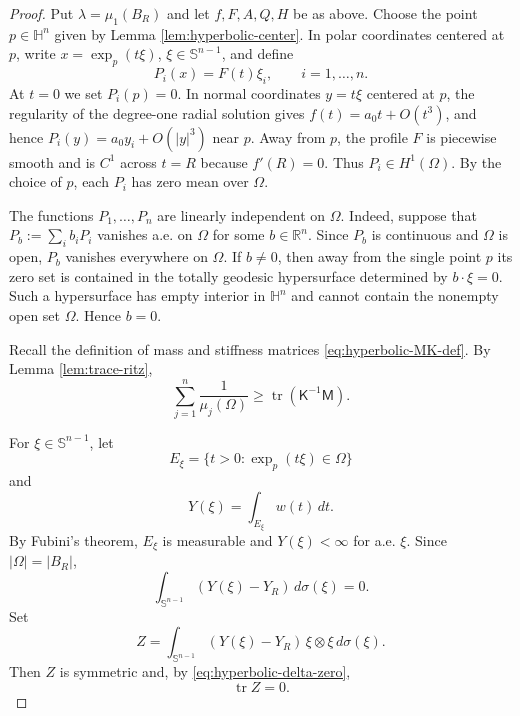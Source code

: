 \documentclass[11pt]{amsart}
\theoremstyle{remark}
\DeclareMathOperator{\tr}{tr}
\newcommand{\HH}{\mathbb H}
\newcommand{\RR}{\mathbb R}
\newcommand{\Sn}{\mathbb S}
\newcommand{\mcM}{\mathsf M}
\newcommand{\mcK}{\mathsf K}
\begin{document}
\begin{proof}
Put $\lambda=\mu_1(B_R)$ and let $f,F,A,Q,H$ be as above.  Choose the point $p\in\HH^n$ given by Lemma \ref{lem:hyperbolic-center}.  In polar coordinates centered at $p$, write $x=\exp_p(t\xi)$, $\xi\in\Sn^{n-1}$, and define
\begin{equation}\label{eq:hyperbolic-P-def}
        P_i(x)=F(t)\xi_i,
        \qquad i=1,\dots,n.
\end{equation}
At $t=0$ we set $P_i(p)=0$.  In normal coordinates $y=t\xi$ centered at $p$, the regularity of the degree-one radial solution gives $f(t)=a_0t+O(t^3)$, and hence $P_i(y)=a_0y_i+O(|y|^3)$ near $p$.  Away from $p$, the profile $F$ is piecewise smooth and is $C^1$ across $t=R$ because $f'(R)=0$.  Thus $P_i\in H^1(\Omega)$.  By the choice of $p$, each $P_i$ has zero mean over $\Omega$.

The functions $P_1,\dots,P_n$ are linearly independent on $\Omega$.  Indeed, suppose that $P_b:=\sum_i b_iP_i$ vanishes a.e. on $\Omega$ for some $b\in\RR^n$.  Since $P_b$ is continuous and $\Omega$ is open, $P_b$ vanishes everywhere on $\Omega$.  If $b\ne0$, then away from the single point $p$ its zero set is contained in the totally geodesic hypersurface determined by $b\cdot\xi=0$.  Such a hypersurface has empty interior in $\HH^n$ and cannot contain the nonempty open set $\Omega$.  Hence $b=0$.

Recall the definition of mass and stiffness matrices \eqref{eq:hyperbolic-MK-def}. By Lemma \ref{lem:trace-ritz},
\begin{equation}\label{eq:hyperbolic-ritz-main}
        \sum_{j=1}^n\frac1{\mu_j(\Omega)}
        \ge \tr(\mcK^{-1}\mcM).
\end{equation}

For $\xi\in\Sn^{n-1}$, let
$$
        E_\xi=\{t>0:\exp_p(t\xi)\in\Omega\}
$$
and
$$
        Y(\xi)=\int_{E_\xi}w(t)\,dt.
$$
By Fubini's theorem, $E_\xi$ is measurable and $Y(\xi)<\infty$ for a.e. $\xi$.  Since $|\Omega|=|B_R|$,
\begin{equation}\label{eq:hyperbolic-delta-zero}
        \int_{\Sn^{n-1}}(Y(\xi)-Y_R)\,d\sigma(\xi)=0.
\end{equation}
Set
\begin{equation}\label{eq:hyperbolic-Z-def}
        Z=\int_{\Sn^{n-1}}(Y(\xi)-Y_R)\,\xi\otimes\xi\,d\sigma(\xi).
\end{equation}
Then $Z$ is symmetric and, by \eqref{eq:hyperbolic-delta-zero},
\begin{equation}\label{eq:hyperbolic-Z-trace-zero}
        \tr Z=0.
\end{equation}


\end{proof}
\end{document}
